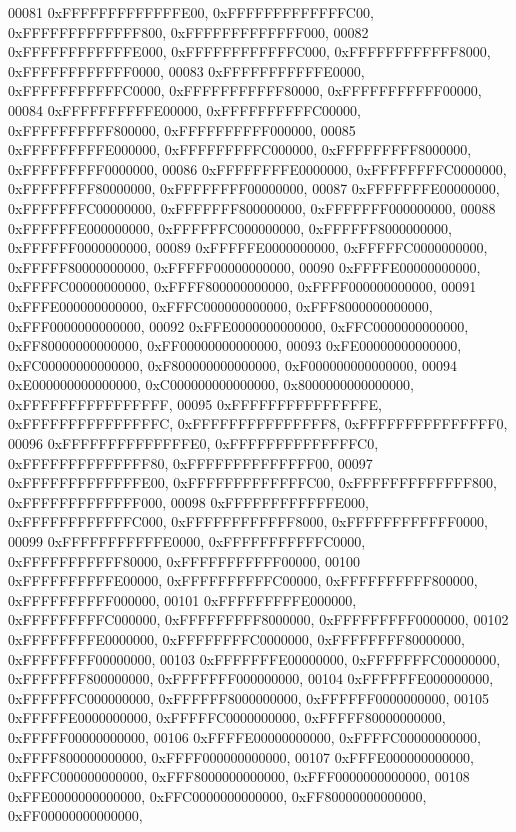 \begin{DoxyCode}
00081         0xFFFFFFFFFFFFFE00, 0xFFFFFFFFFFFFFC00, 0xFFFFFFFFFFFFF800, 0xFFFFFFFFFFFFF000,
00082         0xFFFFFFFFFFFFE000, 0xFFFFFFFFFFFFC000, 0xFFFFFFFFFFFF8000, 0xFFFFFFFFFFFF0000,
00083         0xFFFFFFFFFFFE0000, 0xFFFFFFFFFFFC0000, 0xFFFFFFFFFFF80000, 0xFFFFFFFFFFF00000,
00084         0xFFFFFFFFFFE00000, 0xFFFFFFFFFFC00000, 0xFFFFFFFFFF800000, 0xFFFFFFFFFF000000,
00085         0xFFFFFFFFFE000000, 0xFFFFFFFFFC000000, 0xFFFFFFFFF8000000, 0xFFFFFFFFF0000000,
00086         0xFFFFFFFFE0000000, 0xFFFFFFFFC0000000, 0xFFFFFFFF80000000, 0xFFFFFFFF00000000,
00087         0xFFFFFFFE00000000, 0xFFFFFFFC00000000, 0xFFFFFFF800000000, 0xFFFFFFF000000000,
00088         0xFFFFFFE000000000, 0xFFFFFFC000000000, 0xFFFFFF8000000000, 0xFFFFFF0000000000,
00089         0xFFFFFE0000000000, 0xFFFFFC0000000000, 0xFFFFF80000000000, 0xFFFFF00000000000,
00090         0xFFFFE00000000000, 0xFFFFC00000000000, 0xFFFF800000000000, 0xFFFF000000000000,
00091         0xFFFE000000000000, 0xFFFC000000000000, 0xFFF8000000000000, 0xFFF0000000000000,
00092         0xFFE0000000000000, 0xFFC0000000000000, 0xFF80000000000000, 0xFF00000000000000,
00093         0xFE00000000000000, 0xFC00000000000000, 0xF800000000000000, 0xF000000000000000,
00094         0xE000000000000000, 0xC000000000000000, 0x8000000000000000, 0xFFFFFFFFFFFFFFFF,
00095         0xFFFFFFFFFFFFFFFE, 0xFFFFFFFFFFFFFFFC, 0xFFFFFFFFFFFFFFF8, 0xFFFFFFFFFFFFFFF0,
00096         0xFFFFFFFFFFFFFFE0, 0xFFFFFFFFFFFFFFC0, 0xFFFFFFFFFFFFFF80, 0xFFFFFFFFFFFFFF00,
00097         0xFFFFFFFFFFFFFE00, 0xFFFFFFFFFFFFFC00, 0xFFFFFFFFFFFFF800, 0xFFFFFFFFFFFFF000,
00098         0xFFFFFFFFFFFFE000, 0xFFFFFFFFFFFFC000, 0xFFFFFFFFFFFF8000, 0xFFFFFFFFFFFF0000,
00099         0xFFFFFFFFFFFE0000, 0xFFFFFFFFFFFC0000, 0xFFFFFFFFFFF80000, 0xFFFFFFFFFFF00000,
00100         0xFFFFFFFFFFE00000, 0xFFFFFFFFFFC00000, 0xFFFFFFFFFF800000, 0xFFFFFFFFFF000000,
00101         0xFFFFFFFFFE000000, 0xFFFFFFFFFC000000, 0xFFFFFFFFF8000000, 0xFFFFFFFFF0000000,
00102         0xFFFFFFFFE0000000, 0xFFFFFFFFC0000000, 0xFFFFFFFF80000000, 0xFFFFFFFF00000000,
00103         0xFFFFFFFE00000000, 0xFFFFFFFC00000000, 0xFFFFFFF800000000, 0xFFFFFFF000000000,
00104         0xFFFFFFE000000000, 0xFFFFFFC000000000, 0xFFFFFF8000000000, 0xFFFFFF0000000000,
00105         0xFFFFFE0000000000, 0xFFFFFC0000000000, 0xFFFFF80000000000, 0xFFFFF00000000000,
00106         0xFFFFE00000000000, 0xFFFFC00000000000, 0xFFFF800000000000, 0xFFFF000000000000,
00107         0xFFFE000000000000, 0xFFFC000000000000, 0xFFF8000000000000, 0xFFF0000000000000,
00108         0xFFE0000000000000, 0xFFC0000000000000, 0xFF80000000000000, 0xFF00000000000000,

\end{DoxyCode}
